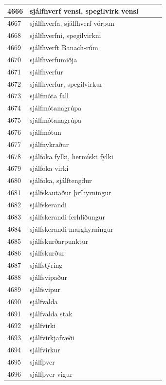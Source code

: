 \begin{longtable}{p{}|p{}|p{}|p{}|p{}}
\hline
4666 & sjálfhverf vensl, spegilvirk vensl &  &  &  \\
\hline
4667 & sjálfhverfa, sjálfhverf vörpun &  &  &  \\
\hline
4668 & sjálfhverfni, spegilvirkni &  &  &  \\
\hline
4669 & sjálfhverft Banach-rúm &  &  &  \\
\hline
4670 & sjálfhverfumiðja &  &  &  \\
\hline
4671 & sjálfhverfur &  &  &  \\
\hline
4672 & sjálfhverfur, spegilvirkur &  &  &  \\
\hline
4673 & sjálfmóta fall &  &  &  \\
\hline
4674 & sjálfmótanagrúpa &  &  &  \\
\hline
4675 & sjálfmótanagrúpa &  &  &  \\
\hline
4676 & sjálfmótun &  &  &  \\
\hline
4677 & sjálfnykraður &  &  &  \\
\hline
4678 & sjálfoka fylki, hermískt fylki &  &  &  \\
\hline
4679 & sjálfoka virki &  &  &  \\
\hline
4680 & sjálfoka, sjálftengdur &  &  &  \\
\hline
4681 & sjálfskautaður þríhyrningur &  &  &  \\
\hline
4682 & sjálfskerandi &  &  &  \\
\hline
4683 & sjálfskerandi ferhliðungur &  &  &  \\
\hline
4684 & sjálfskerandi marghyrningur &  &  &  \\
\hline
4685 & sjálfskurðarpunktur &  &  &  \\
\hline
4686 & sjálfskurður &  &  &  \\
\hline
4687 & sjálfstýring &  &  &  \\
\hline
4688 & sjálfsvipaður &  &  &  \\
\hline
4689 & sjálfsvipur &  &  &  \\
\hline
4690 & sjálfvalda &  &  &  \\
\hline
4691 & sjálfvalda stak &  &  &  \\
\hline
4692 & sjálfvirki &  &  &  \\
\hline
4693 & sjálfvirkjafræði &  &  &  \\
\hline
4694 & sjálfvirkur &  &  &  \\
\hline
4695 & sjálfþver &  &  &  \\
\hline
4696 & sjálfþver vigur &  &  &  \\

\end{longtable}
